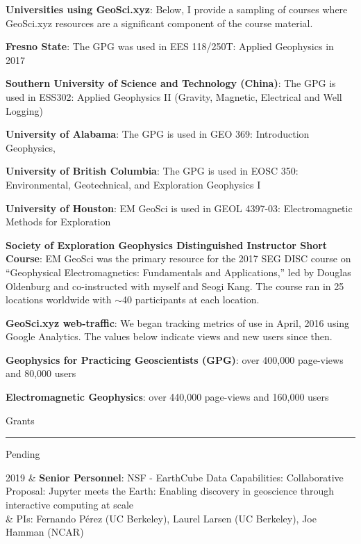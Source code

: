 \documentclass[a4paper, 11pt]{article}
\newcommand{\heading}[1]{
    \begin{minipage}[t]{\textwidth}
    \vspace{0.45cm}
    {\LARGE #1}\\
    \vspace{-0.2cm}
    \hrule
    \end{minipage}
    \vspace{0.2cm}

}
\newcommand{\subheading}[1]{
    \vspace{0.4cm}
    {\Large #1}\\
    \vspace{-0.2cm}
}
\begin{document}
\textbf{Universities using GeoSci.xyz}: Below, I provide a sampling of courses where GeoSci.xyz resources are a significant component of the course material.
\begin{myitemize}\vspace{0.3cm}
\item \textbf{Fresno State}: The GPG was used in EES 118/250T: Applied Geophysics in 2017
\item \textbf{Southern University of Science and Technology (China)}: The GPG is used in ESS302: Applied Geophysics II (Gravity, Magnetic, Electrical and Well Logging)
\item \textbf{University of Alabama}: The GPG is used in GEO 369: Introduction Geophysics,
\item \textbf{University of British Columbia}: The GPG is used in EOSC 350: Environmental, Geotechnical, and Exploration Geophysics I
\item \textbf{University of Houston}: EM GeoSci is used in GEOL 4397-03: Electromagnetic Methods for Exploration
\end{myitemize}\vspace{0.3cm}

\textbf{Society of Exploration Geophysics Distinguished Instructor Short Course}: EM GeoSci was the primary resource for the 2017 SEG DISC course on ``Geophysical Electromagnetics: Fundamentals and Applications,'' led by Douglas Oldenburg and co-instructed with myself and Seogi Kang. The course ran in 25 locations worldwide with $\sim$40 participants at each location.\vspace{0.3cm}

\textbf{GeoSci.xyz web-traffic}: We began tracking metrics of use in April, 2016 using Google Analytics. The values below indicate views and new users since then.
\begin{myitemize}\vspace{0.3cm}
\item \textbf{Geophysics for Practicing Geoscientists (GPG)}: over 400,000 page-views and 80,000 users
\item \textbf{Electromagnetic Geophysics}: over 440,000 page-views and 160,000 users
\end{myitemize}\vspace{0.3cm}



\heading{Grants}
\subheading{Pending}

\begin{entryright}
2019 & \textbf{Senior Personnel}: NSF - EarthCube Data Capabilities: Collaborative Proposal: Jupyter meets the Earth: Enabling discovery in geoscience through interactive computing at scale \\
& PIs: Fernando P\'erez (UC Berkeley), Laurel Larsen (UC Berkeley), Joe Hamman (NCAR) \\
\end{entryright}
\end{document}
